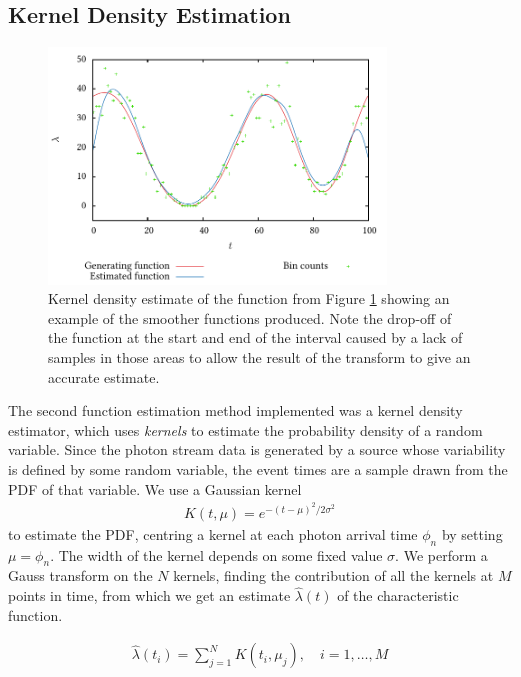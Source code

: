 \documentclass[a4paper,11pt]{article}
\begin{document}
\subsection{Kernel Density Estimation}
\label{sec-3-2}

    \begin{figure}[h]
    \centering
    \includegraphics[width=0.8\textwidth]{images/kde}

    \caption{Kernel density estimate of the function from Figure
    \ref{fig:basecomp} showing an example of the smoother functions
    produced. Note the drop-off of the function at the start and end of the
    interval caused by a lack of samples in those areas to allow the result of
    the transform to give an accurate estimate.}

    \label{fig:basecomp}
    \end{figure}
   The second function estimation method implemented was a kernel density
   estimator, which uses \emph{kernels} to estimate the probability density of a
   random variable. Since the photon stream data is generated by a source whose
   variability is defined by some random variable, the event times are a sample
   drawn from the PDF of that variable. We use a Gaussian kernel
   \begin{align}
   K(t,\mu)=e^{-(t-\mu)^2/2\sigma^2}
   \end{align}
   to estimate the PDF, centring a kernel at each photon arrival time $\phi_n$ by
   setting $\mu=\phi_n$. The width of the kernel depends on some fixed value
   $\sigma$. We perform a Gauss transform on the $N$ kernels, finding the
   contribution of all the kernels at $M$ points in time, from which we get an
   estimate $\hat{\lambda}(t)$ of the characteristic function.

   \begin{align}
   \hat{\lambda}(t_i) = \sum_{j=1}^N K(t_i,\mu_j), \quad i=1,\dots,M
   \end{align}
\end{document}
